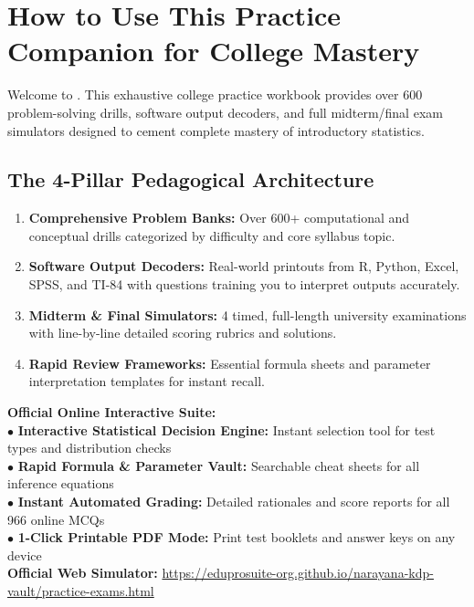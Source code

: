 \tableofcontents
\clearpage

\chapter*{How to Use This Practice Companion for College Mastery}

Welcome to \textbf{\BookTitle}. This exhaustive college practice workbook provides over 600 problem-solving drills, software output decoders, and full midterm/final exam simulators designed to cement complete mastery of introductory statistics.

\section*{The 4-Pillar Pedagogical Architecture}
\begin{enumerate}[leftmargin=1.5em]
  \item \textbf{Comprehensive Problem Banks:} Over 600+ computational and conceptual drills categorized by difficulty and core syllabus topic.
  \item \textbf{Software Output Decoders:} Real-world printouts from R, Python, Excel, SPSS, and TI-84 with questions training you to interpret outputs accurately.
  \item \textbf{Midterm \& Final Simulators:} 4 timed, full-length university examinations with line-by-line detailed scoring rubrics and solutions.
  \item \textbf{Rapid Review Frameworks:} Essential formula sheets and parameter interpretation templates for instant recall.
\end{enumerate}

\begin{center}
\begin{tcolorbox}[standard jigsaw,width=0.95\linewidth,colback=NavyBlue!5!white,colframe=NavyBlue,title=\textbf{FREE DIGITAL WEB COMPANION \& PRACTICE PORTAL}]
\begin{minipage}{0.95\linewidth}
  \textbf{Official Online Interactive Suite:}\\
  $\bullet$ \textbf{Interactive Statistical Decision Engine:} Instant selection tool for test types and distribution checks\\
  $\bullet$ \textbf{Rapid Formula \& Parameter Vault:} Searchable cheat sheets for all inference equations\\
  $\bullet$ \textbf{Instant Automated Grading:} Detailed rationales and score reports for all 966 online MCQs\\
  $\bullet$ \textbf{1-Click Printable PDF Mode:} Print test booklets and answer keys on any device\\[6pt]
  \textbf{Official Web Simulator:} \url{https://eduprosuite-org.github.io/narayana-kdp-vault/practice-exams.html}
\end{minipage}
\end{tcolorbox}
\end{center}

